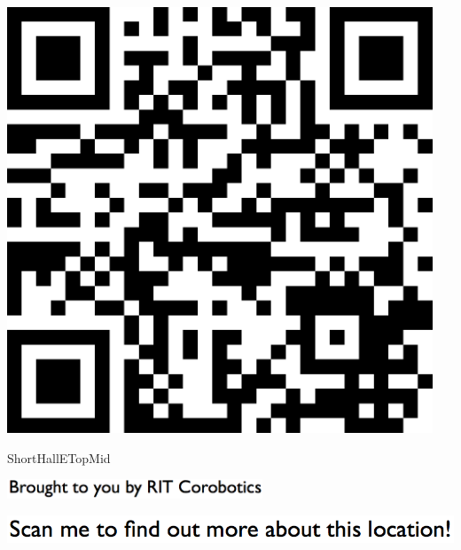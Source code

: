 \documentclass[letterpaper]{article}
\begin{document}
 \begingroup 
 \centerline{\includegraphics[scale=1,width=5in,height=5in]{ShortHallETopMid.png}} 
 \endgroup 
 \vspace*{\fill} 

 \hfill{\small ShortHallETopMid} 

  \vspace{0.7in} 
 
 \centerline{\includegraphics[scale=1,width=3in]{text-bottom.png}} 
 
 \pagebreak 
{} 
 \vspace*{\fill} 
 
  \centerline{\includegraphics[scale=1,width=6in]{text-top.png}} 
 
 \vspace{0.5in} 
 
\end{document}
